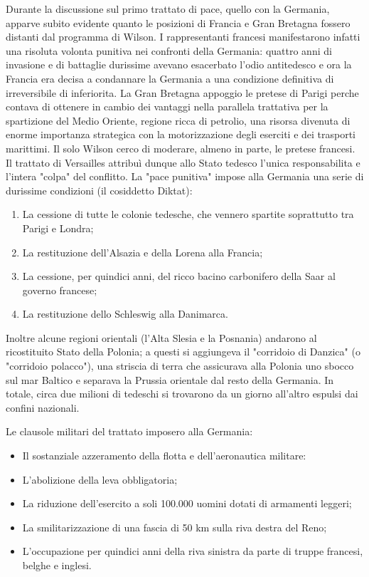 \documentclass[a4paper]{article}
\begin{document}
Durante la discussione sul primo trattato di pace, quello con la Germania, apparve subito
evidente quanto le posizioni di Francia e Gran Bretagna fossero distanti dal programma di
Wilson. I rappresentanti francesi manifestarono infatti una risoluta volonta punitiva nei
confronti della Germania: quattro anni di invasione e di battaglie durissime avevano esacerbato
l'odio antitedesco e ora la Francia era decisa a condannare la Germania a una condizione
definitiva di irreversibile di inferiorita.
La Gran Bretagna appoggio le pretese di Parigi perche contava di ottenere in cambio dei
vantaggi nella parallela trattativa per la spartizione del Medio Oriente, regione ricca di petrolio,
una risorsa divenuta di enorme importanza strategica con la motorizzazione degli eserciti e dei
trasporti marittimi. Il solo Wilson cerco di moderare, almeno in parte, le pretese francesi. Il
trattato di Versailles attribuì dunque allo Stato tedesco l'unica responsabilita e l'intera "colpa"
del conflitto. La "pace punitiva" impose alla Germania una serie di durissime condizioni (il
cosiddetto Diktat):
\begin{enumerate}
    \item La cessione di tutte le colonie tedesche, che vennero spartite soprattutto tra Parigi e
    Londra;
    \item La restituzione dell'Alsazia e della Lorena alla Francia;
    \item La cessione, per quindici anni, del ricco bacino carbonifero della Saar al governo
    francese;
    \item La restituzione dello Schleswig alla Danimarca.
\end{enumerate}
Inoltre alcune regioni orientali (l'Alta Slesia e la Posnania) andarono al ricostituito Stato della
Polonia; a questi si aggiungeva il "corridoio di Danzica" (o "corridoio polacco"), una striscia di
terra che assicurava alla Polonia uno sbocco sul mar Baltico e separava la Prussia orientale dal
resto della Germania.
In totale, circa due milioni di tedeschi si trovarono da un giorno all'altro espulsi dai confini
nazionali.

Le clausole militari del trattato imposero alla Germania:
\begin{itemize}
    \item Il sostanziale azzeramento della flotta e dell'aeronautica militare:
   \item L'abolizione della leva obbligatoria;
   \item La riduzione dell'esercito a soli 100.000 uomini dotati di armamenti leggeri;
   \item La smilitarizzazione di una fascia di 50 km sulla riva destra del Reno;
    \item L'occupazione per quindici anni della riva sinistra da parte di truppe francesi, belghe e inglesi.
\end{itemize}
\end{document}
